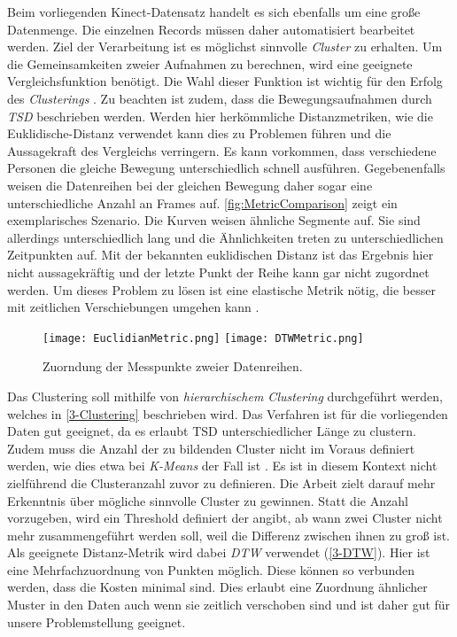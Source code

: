 Beim vorliegenden Kinect-Datensatz handelt es sich ebenfalls um eine große Datenmenge.
Die einzelnen Records müssen daher automatisiert bearbeitet werden.
Ziel der Verarbeitung ist es möglichst sinnvolle \emph{Cluster} zu erhalten.
Um die Gemeinsamkeiten zweier Aufnahmen zu berechnen,
wird eine geeignete Vergleichsfunktion benötigt.
Die Wahl dieser Funktion ist wichtig für den Erfolg des \emph{Clusterings} \citep{warren_liao_clustering_2005}.
Zu beachten ist zudem, dass die Bewegungsaufnahmen durch \emph{\ac{TSD}} beschrieben werden.
Werden hier herkömmliche Distanzmetriken, wie die Euklidische-Distanz verwendet
kann dies zu Problemen führen und die Aussagekraft des Vergleichs verringern.
Es kann vorkommen, dass verschiedene Personen die gleiche Bewegung unterschiedlich schnell ausführen.
Gegebenenfalls weisen die Datenreihen bei der gleichen Bewegung daher sogar eine unterschiedliche Anzahl an Frames auf.
\autoref{fig:MetricComparison} zeigt ein exemplarisches Szenario.
Die Kurven weisen ähnliche Segmente auf.
Sie sind allerdings unterschiedlich lang und die Ähnlichkeiten treten zu unterschiedlichen Zeitpunkten auf.
Mit der bekannten euklidischen Distanz ist das Ergebnis hier nicht aussagekräftig
und der letzte Punkt der Reihe kann gar nicht zugordnet werden.
Um dieses Problem zu lösen ist eine elastische Metrik nötig,
die besser mit zeitlichen Verschiebungen umgehen kann \citep{aghabozorgi_time-series_2015}.

\begin{figure}[ht]
    \begin{center}
    \texttt{[image: EuclidianMetric.png]}
    \texttt{[image: DTWMetric.png]}
    \end{center}
    \caption{Zuorndung der Messpunkte zweier Datenreihen.}
    \label{fig:MetricComparison}
\end{figure}

Das Clustering soll mithilfe von \emph{hierarchischem Clustering} durchgeführt werden,
welches in \autoref{3-Clustering} beschrieben wird.
Das Verfahren ist für die vorliegenden Daten gut geeignet,
da es erlaubt \ac{TSD} unterschiedlicher Länge zu clustern.
Zudem muss die Anzahl der zu bildenden Cluster nicht im Voraus definiert werden,
wie dies etwa bei \emph{K-Means} der Fall ist \citep{aghabozorgi_time-series_2015}.
Es ist in diesem Kontext nicht zielführend die Clusteranzahl zuvor zu definieren.
Die Arbeit zielt darauf mehr Erkenntnis über mögliche sinnvolle Cluster zu gewinnen.
Statt die Anzahl vorzugeben, wird ein Threshold definiert der angibt,
ab wann zwei Cluster nicht mehr zusammengeführt werden soll,
weil die Differenz zwischen ihnen zu groß ist.
Als geeignete Distanz-Metrik wird dabei \emph{\ac{DTW}} verwendet (\autoref{3-DTW}).
Hier ist eine Mehrfachzuordnung von Punkten möglich.
Diese können so verbunden werden, dass die Kosten minimal sind.
Dies erlaubt eine Zuordnung ähnlicher Muster in den Daten auch wenn sie zeitlich verschoben sind
und ist daher gut für unsere Problemstellung geeignet.